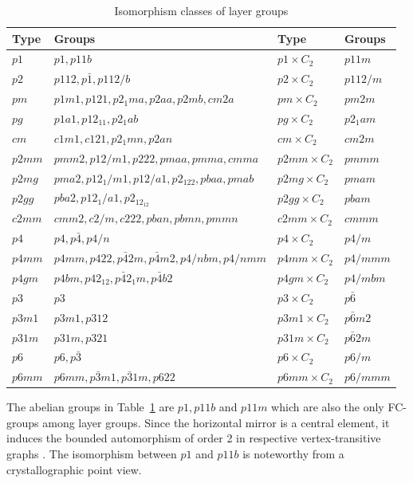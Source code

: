 \documentclass[11pt,a4paper]{article}
\begin{document}
{\tiny
\begin{table}[t]
\begin{center}
\caption{Isomorphism classes of layer groups}
\label{t:table2}
\begin{tabular}{|l|l|l|l|}
\hline
Type & Groups & Type & Groups\\
\hline
$p1$ & $p1, p11b$ & $p1 \times C_2$ & $p11m$ \\
$p2$ & $p112, p\bar1, p112/b$ & $p2 \times C_2$ & $p112/m$ \\
$pm$ & $p1m1, p121, p2_1ma, p2aa, p2mb, cm2a$ & $pm \times C_2$ & $pm2m$ \\
$pg$ & $p1a1, p12_11, p2_1ab$ & $pg \times C_2$ & $p2_1am$ \\
$cm$ & $c1m1, c121, p2_1mn, p2an$ & $cm \times C_2$ & $cm2m$ \\
$p2mm$ & $pmm2, p12/m1, p222, pmaa, pmma, cmma$ & $p2mm \times C_2$ & $pmmm$ \\
$p2mg$ & $pma2, p12_1/m1, p12/a1, p2_122, pbaa, pmab$ & $p2mg \times C_2$ & $pmam$ \\
$p2gg$ & $pba2, p12_1/a1, p2_12_12$ & $p2gg \times C_2$ & $pbam$ \\
$c2mm$ & $cmm2, c2/m, c222, pban, pbmn, pmmn$ & $c2mm \times C_2$ & $cmmm$ \\
$p4$ & $p4, p\bar4, p4/n$ & $p4 \times C_2$ & $p4/m$ \\
$p4mm$ & $p4mm, p422, p\bar42m, p\bar4m2, p4/nbm, p4/nmm$ & $p4mm \times C_2$ & $p4/mmm$ \\
$p4gm$ & $p4bm, p42_12, p\bar42_1m, p\bar4b2$ & $p4gm \times C_2$ & $p4/mbm$ \\
$p3$ & $p3$ & $p3 \times C_2$ & $p\bar6$ \\
$p3m1$ & $p3m1, p312$ & $p3m1 \times C_2$ & $p\bar6m2$ \\
$p31m$ & $p31m, p321$ & $p31m \times C_2$ & $p\bar62m$ \\
$p6$ & $p6, p\bar3$ & $p6 \times C_2$ & $p6/m$ \\
$p6mm$ & $p6mm, p\bar3m1, p\bar31m, p622$ & $p6mm \times C_2$ & $p6/mmm$ \\
\hline
\end{tabular}
\end{center}
\vspace{-1em}
\end{table}
}

The abelian groups in Table~\ref{t:table2} are $p1, p11b$ and $p11m$ which are also the only FC-groups among layer groups. Since the horizontal mirror is a central element, it induces the bounded automorphism of order 2 in respective vertex-transitive graphs \cite{Gromov83}. The isomorphism between $p1$ and $p11b$ is noteworthy from a crystallographic point view.
\end{document}
